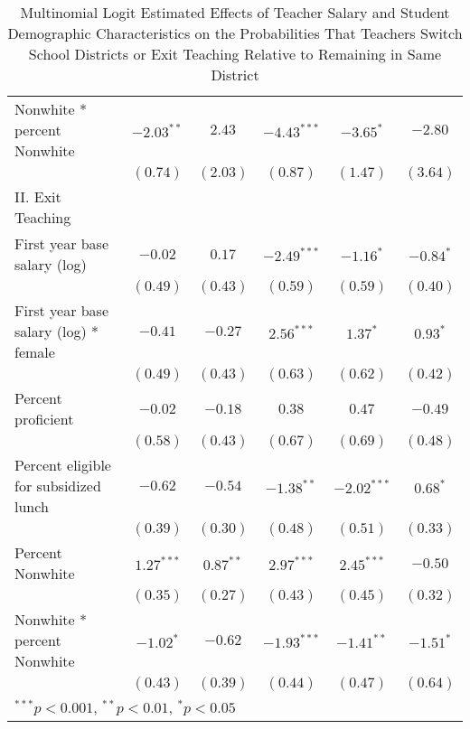 \documentclass[12pt,]{article}
\begin{document}
\begin{table}
\begin{center}
\begin{tabular}{l c c c c c }
\quad Nonwhite * percent Nonwhite            & $-2.03^{**}$ & $2.43$       & $-4.43^{***}$ & $-3.65^{*}$   & $-2.80$     \\
                                                & $(0.74)$     & $(2.03)$     & $(0.87)$      & $(1.47)$      & $(3.64)$    \\
II. Exit Teaching                               &              &              &               &               &             \\
\quad First year base salary (log)           & $-0.02$      & $0.17$       & $-2.49^{***}$ & $-1.16^{*}$   & $-0.84^{*}$ \\
                                                & $(0.49)$     & $(0.43)$     & $(0.59)$      & $(0.59)$      & $(0.40)$    \\
\quad First year base salary (log) * female  & $-0.41$      & $-0.27$      & $2.56^{***}$  & $1.37^{*}$    & $0.93^{*}$  \\
                                                & $(0.49)$     & $(0.43)$     & $(0.63)$      & $(0.62)$      & $(0.42)$    \\
\quad Percent proficient                     & $-0.02$      & $-0.18$      & $0.38$        & $0.47$        & $-0.49$     \\
                                                & $(0.58)$     & $(0.43)$     & $(0.67)$      & $(0.69)$      & $(0.48)$    \\
\quad Percent eligible for subsidized lunch  & $-0.62$      & $-0.54$      & $-1.38^{**}$  & $-2.02^{***}$ & $0.68^{*}$  \\
                                                & $(0.39)$     & $(0.30)$     & $(0.48)$      & $(0.51)$      & $(0.33)$    \\
\quad Percent Nonwhite                       & $1.27^{***}$ & $0.87^{**}$  & $2.97^{***}$  & $2.45^{***}$  & $-0.50$     \\
                                                & $(0.35)$     & $(0.27)$     & $(0.43)$      & $(0.45)$      & $(0.32)$    \\
\quad Nonwhite * percent Nonwhite            & $-1.02^{*}$  & $-0.62$      & $-1.93^{***}$ & $-1.41^{**}$  & $-1.51^{*}$ \\
                                                & $(0.43)$     & $(0.39)$     & $(0.44)$      & $(0.47)$      & $(0.64)$    \\
\hline
\multicolumn{6}{l}{\scriptsize{$^{***}p<0.001$, $^{**}p<0.01$, $^*p<0.05$}}
\end{tabular}
\caption{Multinomial Logit Estimated Effects of Teacher Salary and Student Demographic Characteristics on the Probabilities That Teachers Switch School Districts or Exit Teaching Relative to Remaining in Same District}
\label{tbl:reg_mlogit}
\end{center}
\end{table}
\end{document}
